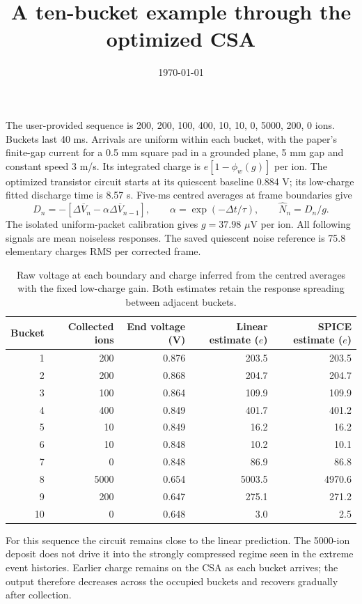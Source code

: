 \documentclass[11pt,a4paper]{article}
\title{A ten-bucket example through the optimized CSA}
\date{\today}
\begin{document}
\maketitle
The user-provided sequence is 200, 200, 100, 400, 10, 10, 0, 5000, 200, 0 ions.
Buckets last 40 ms. Arrivals are uniform within each bucket, with the paper's
finite-gap current for a 0.5 mm square pad in a grounded plane, 5 mm gap and
constant speed 3 m/s. Its integrated charge is $e[1-\phi_w(g)]$ per ion.
The optimized transistor circuit starts at its quiescent baseline 0.884 V;
its low-charge fitted discharge time is 8.57 s. Five-ms centred averages at
frame boundaries give
\[
 D_n=-[\Delta\overline V_n-\alpha\Delta\overline V_{n-1}],\qquad
 \alpha=\exp(-\Delta t/\tau),\qquad \widehat N_n=D_n/g.
\]
The isolated uniform-packet calibration gives $g=37.98$ $\mu$V per ion.
All following signals are mean noiseless responses. The saved quiescent
noise reference is 75.8 elementary charges RMS per corrected frame.

\begin{table}[ht]\centering
\begin{tabular}{rrrrr}\toprule
Bucket & Collected ions & End voltage (V) & Linear estimate ($e$) & SPICE estimate ($e$)\\\midrule
1 & 200 & 0.876 & 203.5 & 203.5 \\
2 & 200 & 0.868 & 204.7 & 204.7 \\
3 & 100 & 0.864 & 109.9 & 109.9 \\
4 & 400 & 0.849 & 401.7 & 401.2 \\
5 & 10 & 0.849 & 16.2 & 16.2 \\
6 & 10 & 0.848 & 10.2 & 10.1 \\
7 & 0 & 0.848 & 86.9 & 86.8 \\
8 & 5000 & 0.654 & 5003.5 & 4970.6 \\
9 & 200 & 0.647 & 275.1 & 271.2 \\
10 & 0 & 0.648 & 3.0 & 2.5 \\
\bottomrule\end{tabular}
\caption{Raw voltage at each boundary and charge inferred from the centred
averages with the fixed low-charge gain. Both estimates retain the response
spreading between adjacent buckets.}\end{table}

For this sequence the circuit remains close to the linear prediction.
The 5000-ion deposit does not drive it into the strongly compressed regime seen
in the extreme event histories. Earlier charge remains on the CSA as each
bucket arrives; the output therefore decreases across the occupied buckets and
recovers gradually after collection.
\end{document}

